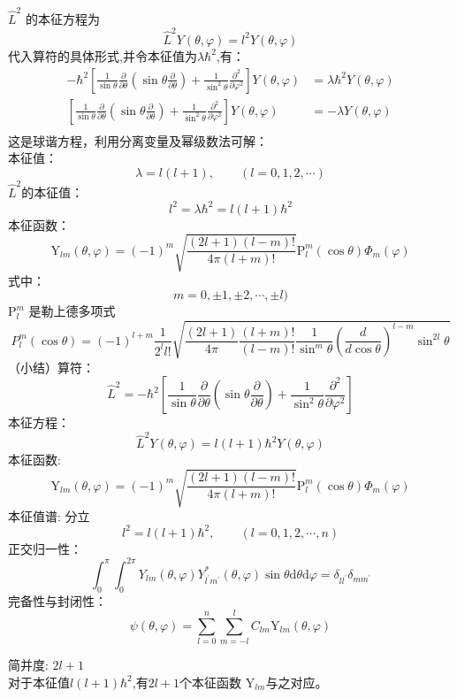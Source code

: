 \begin{frame} [allowframebreaks=]
    \frametitle{}
    $\hat{L}^2$ 的本征方程为 $$\hat{L}^2Y(\theta,\varphi)=l^2 Y(\theta,\varphi)$$
    代入算符的具体形式,并令本征值为$\lambda\hbar^2$,有：
    \begin{equation*}
        \begin{split}
            -\hbar^{2}\left[\frac{1}{\sin \theta} \frac{\partial}{\partial \theta}\left(\sin \theta \frac{\partial}{\partial \theta}\right)+\frac{1}{\sin ^{2} \theta} \frac{\partial^{2}}{\partial \varphi^{2}}\right] Y(\theta,\varphi)&=\lambda\hbar^2 Y(\theta,\varphi) \\
            \left[\frac{1}{\sin \theta} \frac{\partial}{\partial \theta}\left(\sin \theta \frac{\partial}{\partial \theta}\right)+\frac{1}{\sin ^{2} \theta} \frac{\partial^{2}}{\partial \varphi^{2}}\right] Y(\theta,\varphi)&=-\lambda Y(\theta,\varphi) \\
        \end{split} 
    \end{equation*}
    这是球谐方程，利用分离变量及幂级数法可解：\\
    本征值： $$\lambda=l(l+1), \qquad (l= 0,1,2,\cdots)$$
    $\hat{L}^2$的本征值：$$l^2=\lambda\hbar^2=l(l+1)\hbar^2$$
    本征函数：
    $$
    \mathrm{Y}_{l m}(\theta, \varphi)=(-1)^{m} \sqrt{\frac{(2 l+1)(l-m) !}{4 \pi(l+m) !}} \mathrm{P}_{l}^{m}(\cos \theta) \Phi_{m}(\varphi)
    $$ 
    式中：
    $$ m=0,\pm 1,  \pm 2, \cdots, \pm l)  $$
    $\mathrm{P}_{l}^{m} $ 是勒上德多项式
    $$
    P_{l}^{m}(\cos \theta)=(-1)^{l+m} \frac{1}{2^{l} l !} \sqrt{\frac{(2 l+1)}{4 \pi} \frac{(l+m) !}{(l-m) !} \frac{1}{\sin ^{m} \theta}\left(\frac{d}{d \cos \theta}\right)^{l-m} \sin ^{2 l} \theta}
    $$
    （小结）算符：  $$ \hat{L}^{2}=-\hbar^{2}\left[\frac{1}{\sin \theta} \frac{\partial}{\partial \theta}\left(\sin \theta \frac{\partial}{\partial \theta}\right)+\frac{1}{\sin ^{2} \theta} \frac{\partial^{2}}{\partial \varphi^{2}}\right] $$
    本征方程： $$\hat{L}^2Y(\theta,\varphi)=l(l+1)\hbar^2 Y(\theta,\varphi)$$
    本征函数:     $$
    \mathrm{Y}_{l m}(\theta, \varphi)=(-1)^{m} \sqrt{\frac{(2 l+1)(l-m) !}{4 \pi(l+m) !}} \mathrm{P}_{l}^{m}(\cos \theta) \Phi_{m}(\varphi)
    $$ 
    本征值谱:  分立
    $$l^2=l(l+1)\hbar^2, \qquad (l= 0,1,2,\cdots, n) $$
    正交归一性：
    $$
    \int_{0}^{\pi} \int_{0}^{2 \pi} Y_{l m}(\theta, \varphi) Y_{l^{\prime} m^{\prime}}^{*}(\theta, \varphi) \sin \theta \mathrm{d} \theta \mathrm{d} \varphi=\delta_{l l^{\prime}} \delta_{m m^{\prime}}
    $$
    完备性与封闭性：
    $$\psi(\theta, \varphi)=\sum_{l=0}^{n} \sum_{m=-l}^{l} C_{l m} \mathrm{Y}_{l m}(\theta, \varphi)$$

    简并度: $2l+1$\\
    对于本征值$l(l+1)\hbar^2$,有$2l+1$个本征函数 $\mathrm{Y}_{l m}$与之对应。
\end{frame} 

